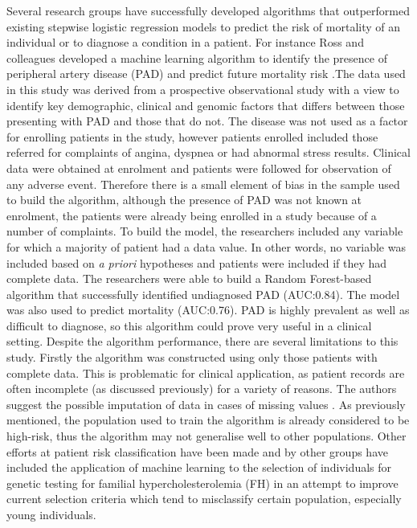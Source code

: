 Several research groups have successfully developed algorithms that outperformed existing stepwise logistic regression models to predict the risk of mortality of an individual or to diagnose a condition in a patient. For instance  Ross and colleagues developed a machine learning algorithm to identify the presence of peripheral artery disease (PAD) and predict future mortality risk \citep{Ross:2016kh}.The data used in this study was derived from a prospective observational study with a view to identify key demographic, clinical and genomic factors that differs between those presenting with PAD and those that do not. The disease was not used as a factor for enrolling patients in the study, however patients enrolled included those referred for complaints of angina, dyspnea or had abnormal stress results. Clinical data were obtained at enrolment and patients were followed for observation of any adverse event. Therefore there is a small element of bias in the sample used to build the algorithm, although the presence of PAD was not known at enrolment, the patients were already being enrolled in a study because of a number of complaints.\newline
 To build the model, the researchers included any variable for which a majority of patient had a data value. In other words, no variable was included based on \textit{a priori} hypotheses and patients were included if they had complete data. The researchers were able to build a Random Forest-based algorithm that successfully identified undiagnosed PAD (AUC:0.84). The model was also used to predict mortality (AUC:0.76). PAD is highly prevalent as well as difficult to diagnose, so this algorithm could prove very useful in a clinical setting.\newline
 Despite the algorithm performance, there are several limitations to this study. Firstly the algorithm was constructed using only those patients with complete data. This is problematic for clinical application, as patient records are often incomplete (as discussed previously) for a variety of reasons. The authors suggest the possible imputation of data in cases of missing values \citep{Ross:2016kh}. As previously mentioned, the population used to train the algorithm is already considered  to be high-risk, thus the algorithm may not generalise well to other populations.\newline
 Other efforts at patient risk classification have been made  and by other groups have included the application of machine learning to the selection of individuals for genetic testing for familial hypercholesterolemia (FH) \citep{Besseling:2017bs} in an attempt to improve current selection criteria which tend to misclassify certain population, especially young individuals.\newline
